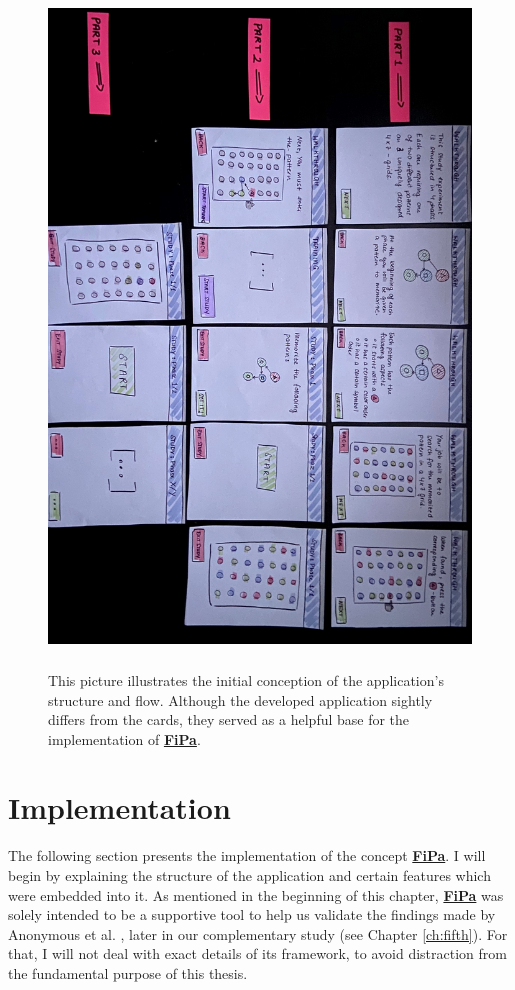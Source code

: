 \begin{figure}[t!]
\centering
\includegraphics[width=15cm, height=18cm]{Chapters/graphics/pitch.jpg}
\caption{This picture illustrates the initial conception of the application's structure and flow. Although the developed application sightly differs from the cards, they served as a helpful base for the implementation of \underline{\textbf{FiPa}}.}
\label{fig:fipapitch}
\end{figure}
   
\section{Implementation} \label{4.3}

The following section presents the implementation of the concept \underline{\textbf{FiPa}}. I will begin by explaining the structure of the application and certain features which were embedded into it. As mentioned in the beginning of this chapter, \underline{\textbf{FiPa}} was solely intended to be a supportive tool to help us validate the findings made by Anonymous et al. \cite{anonymous}, later in our complementary study (see Chapter \ref{ch:fifth}). For that, I will not deal with exact details of its framework, to avoid distraction from the fundamental purpose of this thesis.\\

